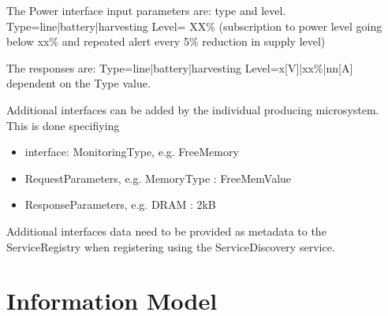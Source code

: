 \documentclass[a4paper]{arrowhead}
\begin{document}

The Power interface input parameters are: type and level.
Type=line|battery|harvesting
Level= XX\% (subscription to power level going below xx\% and repeated
alert every 5\% reduction in supply level) 

The responses are:
Type=line|battery|harvesting
Level=x[V]|xx\%|nn[A] dependent on the Type value.


Additional interfaces can be added by the individual producing
microsystem. This is done specifiying
\begin{itemize}
  
\item interface: MonitoringType, e.g. FreeMemory
\item RequestParameters, e.g. MemoryType : FreeMemValue
\item ResponseParameters, e.g. DRAM : 2kB
\end{itemize}  

Additional interfaces data need to be provided as metadata to the ServiceRegistry when
registering using the ServiceDiscovery service.  


\section{Information Model}
\label{sec:model}




\end{document}
